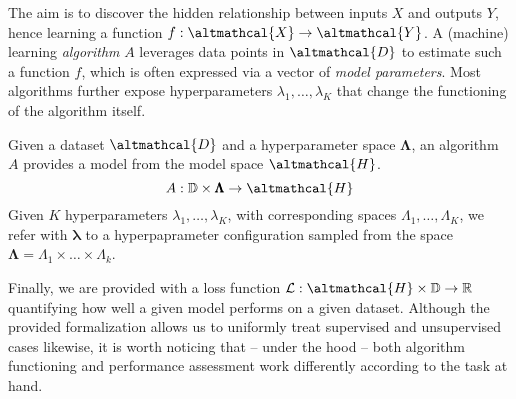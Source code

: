\documentclass[a4paper,12pt,times,numbered,print,index]{Classes/PhDThesisPSnPDF}
\begin{document}
The aim is to discover the hidden relationship between inputs $X$ and outputs $Y$, hence learning a function $f: \altmathcal{X} \rightarrow \altmathcal{Y}$.
A (machine) learning \textit{algorithm} $A$ leverages data points in $\altmathcal{D}$ to estimate such a function $f$, which is often expressed via a vector of \textit{model parameters}.
Most algorithms further expose hyperparameters $\lambda_1, \dots, \lambda_K$ that change the functioning of the algorithm itself.

\begin{definition}\label{def:algorithm}
    Given a dataset $\altmathcal{D}$ and a hyperparameter space $\pmb{\Lambda}$, an algorithm $A$ provides a model from the model space $\altmathcal{H}$.
    \begin{equation}\label{eq:algorithm}
        A: \mathbb{D} \times \pmb{\Lambda} \rightarrow \altmathcal{H}
    \end{equation}
    Given $K$ hyperparameters $\lambda_1, \dots, \lambda_K$, with corresponding spaces $\Lambda_1, \dots, \Lambda_K$, we refer with $\pmb{\lambda}$ to a hyperpaprameter configuration sampled from the space $\pmb{\Lambda} = \Lambda_1 \times \dots \times \Lambda_k$.
\end{definition}

Finally, we are provided with a loss function $\mathcal{L}: \altmathcal{H} \times \mathbb{D} \rightarrow \mathbb{R}$ quantifying how well a given model performs on a given dataset.
Although the provided formalization allows us to uniformly treat supervised and unsupervised cases likewise, it is worth noticing that -- under the hood -- both algorithm functioning and performance assessment work differently according to the task at hand.









\end{document}
